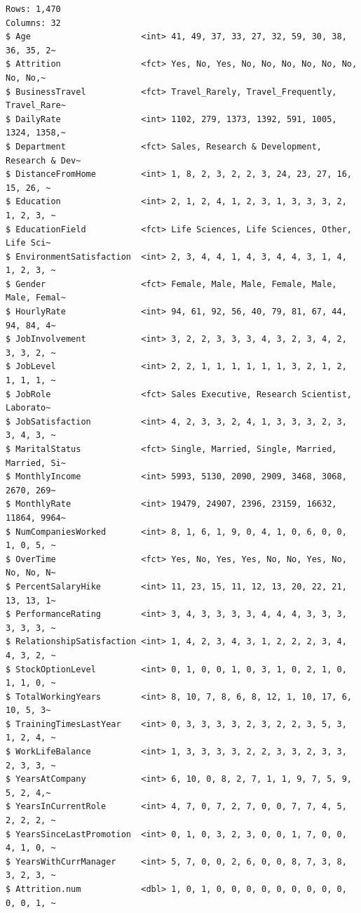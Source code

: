 \documentclass[
  letterpaper,
  DIV=11,
  numbers=noendperiod]{scrreprt}
\begin{document}
\begin{verbatim}
Rows: 1,470
Columns: 32
$ Age                      <int> 41, 49, 37, 33, 27, 32, 59, 30, 38, 36, 35, 2~
$ Attrition                <fct> Yes, No, Yes, No, No, No, No, No, No, No, No,~
$ BusinessTravel           <fct> Travel_Rarely, Travel_Frequently, Travel_Rare~
$ DailyRate                <int> 1102, 279, 1373, 1392, 591, 1005, 1324, 1358,~
$ Department               <fct> Sales, Research & Development, Research & Dev~
$ DistanceFromHome         <int> 1, 8, 2, 3, 2, 2, 3, 24, 23, 27, 16, 15, 26, ~
$ Education                <int> 2, 1, 2, 4, 1, 2, 3, 1, 3, 3, 3, 2, 1, 2, 3, ~
$ EducationField           <fct> Life Sciences, Life Sciences, Other, Life Sci~
$ EnvironmentSatisfaction  <int> 2, 3, 4, 4, 1, 4, 3, 4, 4, 3, 1, 4, 1, 2, 3, ~
$ Gender                   <fct> Female, Male, Male, Female, Male, Male, Femal~
$ HourlyRate               <int> 94, 61, 92, 56, 40, 79, 81, 67, 44, 94, 84, 4~
$ JobInvolvement           <int> 3, 2, 2, 3, 3, 3, 4, 3, 2, 3, 4, 2, 3, 3, 2, ~
$ JobLevel                 <int> 2, 2, 1, 1, 1, 1, 1, 1, 3, 2, 1, 2, 1, 1, 1, ~
$ JobRole                  <fct> Sales Executive, Research Scientist, Laborato~
$ JobSatisfaction          <int> 4, 2, 3, 3, 2, 4, 1, 3, 3, 3, 2, 3, 3, 4, 3, ~
$ MaritalStatus            <fct> Single, Married, Single, Married, Married, Si~
$ MonthlyIncome            <int> 5993, 5130, 2090, 2909, 3468, 3068, 2670, 269~
$ MonthlyRate              <int> 19479, 24907, 2396, 23159, 16632, 11864, 9964~
$ NumCompaniesWorked       <int> 8, 1, 6, 1, 9, 0, 4, 1, 0, 6, 0, 0, 1, 0, 5, ~
$ OverTime                 <fct> Yes, No, Yes, Yes, No, No, Yes, No, No, No, N~
$ PercentSalaryHike        <int> 11, 23, 15, 11, 12, 13, 20, 22, 21, 13, 13, 1~
$ PerformanceRating        <int> 3, 4, 3, 3, 3, 3, 4, 4, 4, 3, 3, 3, 3, 3, 3, ~
$ RelationshipSatisfaction <int> 1, 4, 2, 3, 4, 3, 1, 2, 2, 2, 3, 4, 4, 3, 2, ~
$ StockOptionLevel         <int> 0, 1, 0, 0, 1, 0, 3, 1, 0, 2, 1, 0, 1, 1, 0, ~
$ TotalWorkingYears        <int> 8, 10, 7, 8, 6, 8, 12, 1, 10, 17, 6, 10, 5, 3~
$ TrainingTimesLastYear    <int> 0, 3, 3, 3, 3, 2, 3, 2, 2, 3, 5, 3, 1, 2, 4, ~
$ WorkLifeBalance          <int> 1, 3, 3, 3, 3, 2, 2, 3, 3, 2, 3, 3, 2, 3, 3, ~
$ YearsAtCompany           <int> 6, 10, 0, 8, 2, 7, 1, 1, 9, 7, 5, 9, 5, 2, 4,~
$ YearsInCurrentRole       <int> 4, 7, 0, 7, 2, 7, 0, 0, 7, 7, 4, 5, 2, 2, 2, ~
$ YearsSinceLastPromotion  <int> 0, 1, 0, 3, 2, 3, 0, 0, 1, 7, 0, 0, 4, 1, 0, ~
$ YearsWithCurrManager     <int> 5, 7, 0, 0, 2, 6, 0, 0, 8, 7, 3, 8, 3, 2, 3, ~
$ Attrition.num            <dbl> 1, 0, 1, 0, 0, 0, 0, 0, 0, 0, 0, 0, 0, 0, 1, ~
\end{verbatim}
\end{document}
